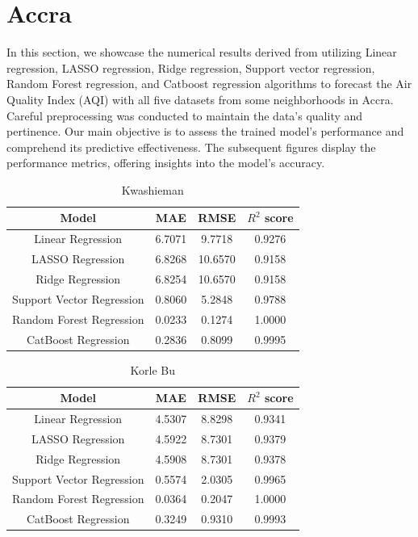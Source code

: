 \documentclass{book}
\numberwithin{equation}{section}
\numberwithin{figure}{section}
\begin{document}
\section{Accra}
\label{chp:numericalresults}
In this section, we showcase the numerical results derived from utilizing Linear regression, LASSO regression, Ridge regression, Support vector regression, Random Forest regression, and Catboost regression algorithms to forecast the Air Quality Index (AQI) with all five datasets from some neighborhoods in Accra. Careful preprocessing was conducted to maintain the data's quality and pertinence. Our main objective is to assess the trained model's performance and comprehend its predictive effectiveness. The subsequent figures display the performance metrics, offering insights into the model's accuracy.
\begin{table}[H]
    \centering
    \begin{tabular}{|c|c|c|c|}
        \hline
        Model & MAE & RMSE & $R^2$ score \\
        \hline
        Linear Regression & 6.7071 & 9.7718 & 0.9276 \\
        \hline
        LASSO Regression & 6.8268 & 10.6570 & 0.9158 \\
        \hline
        Ridge Regression & 6.8254 & 10.6570 & 0.9158 \\
        \hline
        Support Vector Regression & 0.8060 & 5.2848 & 0.9788 \\
        \hline
        Random Forest Regression & 0.0233 & 0.1274 & 1.0000 \\
        \hline
        CatBoost Regression &  0.2836 & 0.8099 &  0.9995 \\\hline
    \end{tabular}
    \caption{Kwashieman}
   \label{tab: all algorithms on Kwashieman}
\end{table}
\begin{table}[H]
    \centering
    \begin{tabular}{|c|c|c|c|}
        \hline
        Model & MAE & RMSE & $R^2$ score \\
        \hline
        Linear Regression & 4.5307 & 8.8298 & 0.9341 \\
        \hline
        LASSO Regression & 4.5922 & 8.7301 & 0.9379 \\
        \hline
        Ridge Regression & 4.5908 & 8.7301 & 0.9378 \\
        \hline
        Support Vector Regression & 0.5574 & 2.0305 & 0.9965 \\
        \hline
        Random Forest Regression & 0.0364 & 0.2047 & 1.0000 \\
        \hline
        CatBoost Regression & 0.3249 & 0.9310 & 0.9993 \\\hline
    \end{tabular}
    \caption{Korle Bu}
   \label{tab: all algorithms on Korle Bu}
\end{table}
\end{document}
